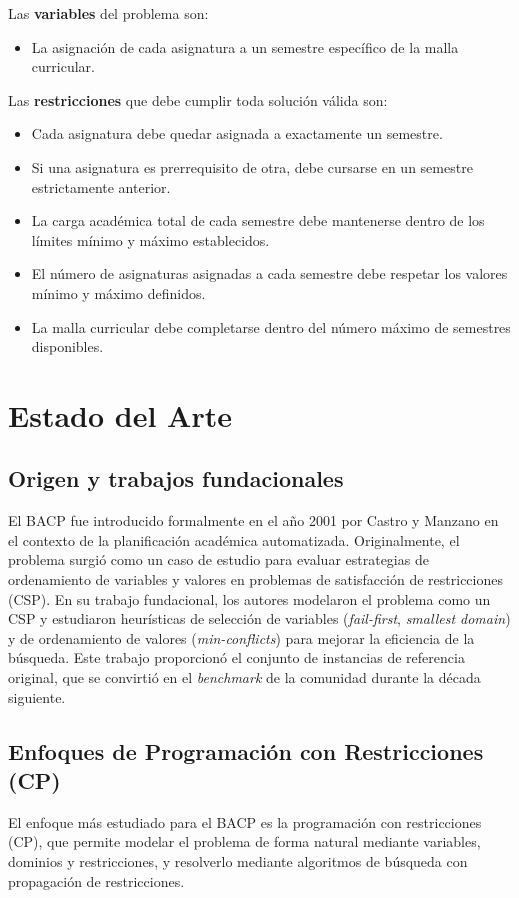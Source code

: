 \documentclass[letter, 10pt]{article}
\begin{document}
Las \textbf{variables} del problema son:
\begin{itemize}
    \item La asignaci\'on de cada asignatura a un semestre 
    espec\'ifico de la malla curricular.
\end{itemize}

Las \textbf{restricciones} que debe cumplir toda soluci\'on 
v\'alida son:
\begin{itemize}
    \item Cada asignatura debe quedar asignada a exactamente 
    un semestre.
    \item Si una asignatura es prerrequisito de otra, debe 
    cursarse en un semestre estrictamente anterior.
    \item La carga acad\'emica total de cada semestre debe 
    mantenerse dentro de los l\'imites m\'inimo y m\'aximo 
    establecidos.
    \item El n\'umero de asignaturas asignadas a cada semestre 
    debe respetar los valores m\'inimo y m\'aximo definidos.
    \item La malla curricular debe completarse dentro del 
    n\'umero m\'aximo de semestres disponibles.
\end{itemize}

\section{Estado del Arte}
\subsection{Origen y trabajos fundacionales}
El BACP fue introducido formalmente en el a\~no 2001 por Castro y Manzano \cite{Castro2001} en el contexto de la planificaci\'on acad\'emica automatizada. Originalmente, el problema surgi\'o como un caso de estudio para evaluar estrategias de ordenamiento de variables y valores en problemas de satisfacci\'on de restricciones (CSP). En su trabajo fundacional, los autores modelaron el problema como un CSP y estudiaron heur\'isticas de selecci\'on de variables (\textit{fail-first}, \textit{smallest domain}) y de ordenamiento de valores (\textit{min-conflicts}) para mejorar la eficiencia de la b\'usqueda. Este trabajo proporcion\'o el conjunto de instancias de referencia original, que se convirti\'o en el \textit{benchmark} de la comunidad durante la d\'ecada siguiente.

\subsection{Enfoques de Programaci\'on con Restricciones (CP)}
El enfoque m\'as estudiado para el BACP es la programaci\'on con restricciones (CP), que permite modelar el problema de forma natural mediante variables, dominios y restricciones, y resolverlo mediante algoritmos de b\'usqueda con propagaci\'on de restricciones. 
\end{document}
